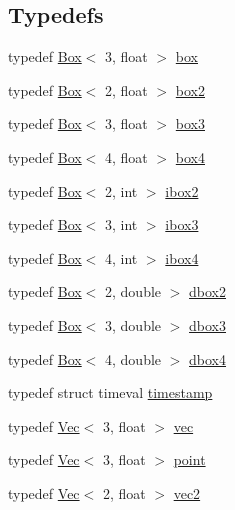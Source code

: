 \subsection*{Typedefs}
\begin{DoxyCompactItemize}
\item 
typedef \hyperlink{classtrimesh_1_1Box}{Box}$<$ 3, float $>$ \hyperlink{namespacetrimesh_aaa1e325da32038bae3d7e0a4d0b82595}{box}
\item 
typedef \hyperlink{classtrimesh_1_1Box}{Box}$<$ 2, float $>$ \hyperlink{namespacetrimesh_aa7a0431b51a4f26529220102f2c3fbaf}{box2}
\item 
typedef \hyperlink{classtrimesh_1_1Box}{Box}$<$ 3, float $>$ \hyperlink{namespacetrimesh_a9e17cc729ed337e9a4a06ebabb620f05}{box3}
\item 
typedef \hyperlink{classtrimesh_1_1Box}{Box}$<$ 4, float $>$ \hyperlink{namespacetrimesh_a5939b29ca3de257c1f8680a72e79bf35}{box4}
\item 
typedef \hyperlink{classtrimesh_1_1Box}{Box}$<$ 2, int $>$ \hyperlink{namespacetrimesh_a6535188633f2044f51969cc6a3c54bc3}{ibox2}
\item 
typedef \hyperlink{classtrimesh_1_1Box}{Box}$<$ 3, int $>$ \hyperlink{namespacetrimesh_a0f0cee6ebe44dca10921852ee1d70958}{ibox3}
\item 
typedef \hyperlink{classtrimesh_1_1Box}{Box}$<$ 4, int $>$ \hyperlink{namespacetrimesh_a29cfd89f2cbe0ca86947f93f0d0ff9da}{ibox4}
\item 
typedef \hyperlink{classtrimesh_1_1Box}{Box}$<$ 2, double $>$ \hyperlink{namespacetrimesh_a946f3fa465346c3a1cc575b5b1acd90b}{dbox2}
\item 
typedef \hyperlink{classtrimesh_1_1Box}{Box}$<$ 3, double $>$ \hyperlink{namespacetrimesh_aab916e55b81cb4357797fe5493e14b09}{dbox3}
\item 
typedef \hyperlink{classtrimesh_1_1Box}{Box}$<$ 4, double $>$ \hyperlink{namespacetrimesh_ae0210243c7c81e889ed86f6e4feeb016}{dbox4}
\item 
typedef struct timeval \hyperlink{namespacetrimesh_afc360812cb91ca27ac234664b59fe356}{timestamp}
\item 
typedef \hyperlink{classtrimesh_1_1Vec}{Vec}$<$ 3, float $>$ \hyperlink{namespacetrimesh_a4fc2b83feba99c931f837a0c7d4b4df1}{vec}
\item 
typedef \hyperlink{classtrimesh_1_1Vec}{Vec}$<$ 3, float $>$ \hyperlink{namespacetrimesh_a325b99fd6454b22fa4c4bc3223271b2c}{point}
\item 
typedef \hyperlink{classtrimesh_1_1Vec}{Vec}$<$ 2, float $>$ \hyperlink{namespacetrimesh_a7ffb277473a9d38774ea3d2e0818ce66}{vec2}

\end{DoxyCompactItemize}
